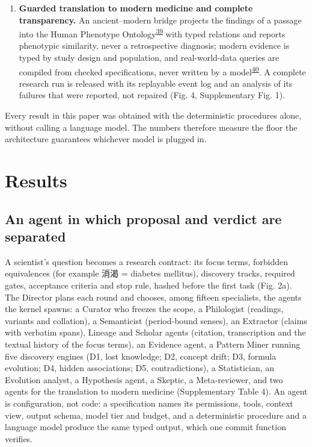 \documentclass[
]{article}
\begin{document}
\begin{enumerate}
  counted apart, on a held-out split fixed before the first run and in
  blind rounds; and a blind temporal benchmark asks whether what the
  agent ranks from the past anticipates what later physicians wrote,
  with every read path bounded in time so that leakage is counted rather
  than assumed (Figs. 5 and 6, Table 2).
\item
  \textbf{Guarded translation to modern medicine and complete
  transparency.} An ancient--modern bridge projects the findings of a
  passage into the Human Phenotype
  Ontology\textsuperscript{\protect\hyperlink{ref-kohler2021hpo}{39}}
  with typed relations and reports phenotypic similarity, never a
  retrospective diagnosis; modern evidence is typed by study design and
  population, and real-world-data queries are compiled from checked
  specifications, never written by a
  model\textsuperscript{\protect\hyperlink{ref-hripcsak2015ohdsi}{40}}.
  A complete research run is released with its replayable event log and
  an analysis of its failures that were reported, not repaired (Fig. 4,
  Supplementary Fig. 1).
\end{enumerate}

Every result in this paper was obtained with the deterministic
procedures alone, without calling a language model. The numbers
therefore measure the floor the architecture guarantees whichever model
is plugged in.

\hypertarget{results}{%
\section{Results}\label{results}}

\hypertarget{an-agent-in-which-proposal-and-verdict-are-separated}{%
\subsection{An agent in which proposal and verdict are
separated}\label{an-agent-in-which-proposal-and-verdict-are-separated}}

A scientist's question becomes a research contract: its focus terms,
forbidden equivalences (for example 消渴 = diabetes mellitus), discovery
tracks, required gates, acceptance criteria and stop rule, hashed before
the first task (Fig. 2a). The Director plans each round and chooses,
among fifteen specialists, the agents the kernel spawns: a Curator who
freezes the scope, a Philologist (readings, variants and collation), a
Semanticist (period-bound senses), an Extractor (claims with verbatim
spans), Lineage and Scholar agents (citation, transcription and the
textual history of the focus terms), an Evidence agent, a Pattern Miner
running five discovery engines (D1, lost knowledge; D2, concept drift;
D3, formula evolution; D4, hidden associations; D5, contradictions), a
Statistician, an Evolution analyst, a Hypothesis agent, a Skeptic, a
Meta-reviewer, and two agents for the translation to modern medicine
(Supplementary Table 4). An agent is configuration, not code: a
specification names its permissions, tools, context view, output schema,
model tier and budget, and a deterministic procedure and a language
model produce the same typed output, which one commit function verifies.
\end{document}
